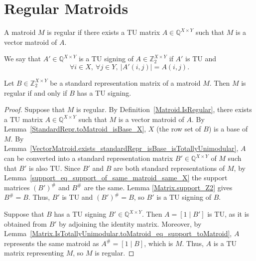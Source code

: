 \section{Regular Matroids}

\begin{definition}
    \label{Matroid.IsRegular}
    \leanok
    A matroid $M$ is regular if there exists a TU matrix $A \in \mathbb{Q}^{X \times Y}$ such that $M$ is a vector matroid of $A$.
\end{definition}

\begin{definition}
    \label{Matrix.IsTuSigningOf}
    \leanok
    We say that $A' \in \mathbb{Q}^{X \times Y}$ is a TU signing of $A \in \mathbb{Z}_{2}^{X \times Y}$ if $A'$ is TU and
    \[
        \forall i \in X, \ \forall j \in Y, \ |A' (i, j)| = A (i, j).
    \]
\end{definition}


\begin{lemma}
    \label{StandardRepr.toMatroid_isRegular_iff_hasTuSigning}
    \leanok
    Let $B \in \mathbb{Z}_{2}^{X \times Y}$ be a standard representation matrix of a matroid $M$. Then $M$ is regular if and only if $B$ has a TU signing.
\end{lemma}

\begin{proof}
    \leanok
    Suppose that $M$ is regular. By Definition~\ref{Matroid.IsRegular}, there exists a TU matrix $A \in \mathbb{Q}^{X \times Y}$ such that $M$ is a vector matroid of $A$. By Lemma~\ref{StandardRepr.toMatroid_isBase_X}, $X$ (the row set of $B$) is a base of $M$. By Lemma~\ref{VectorMatroid.exists_standardRepr_isBase_isTotallyUnimodular}, $A$ can be converted into a standard representation matrix $B' \in \mathbb{Q}^{X \times Y}$ of $M$ such that $B'$ is also TU. Since $B'$ and $B$ are both standard representations of $M$, by Lemma~\ref{support_eq_support_of_same_matroid_same_X} the support matrices $(B')^{\#}$ and $B^{\#}$ are the same. Lemma \ref{Matrix.support_Z2} gives $B^{\#} = B$. Thus, $B'$ is TU and $(B')^{\#} = B$, so $B'$ is a TU signing of $B$.

    Suppose that $B$ has a TU signing $B' \in \mathbb{Q}^{X \times Y}$. Then $A = [1 \mid B']$ is TU, as it is obtained from $B'$ by adjoining the identity matrix. Moreover, by Lemma~\ref{Matrix.IsTotallyUnimodular.toMatroid_eq_support_toMatroid}, $A$ represents the same matroid as $A^{\#} = [1 \mid B]$, which is $M$. Thus, $A$ is a TU matrix representing $M$, so $M$ is regular.
\end{proof}
